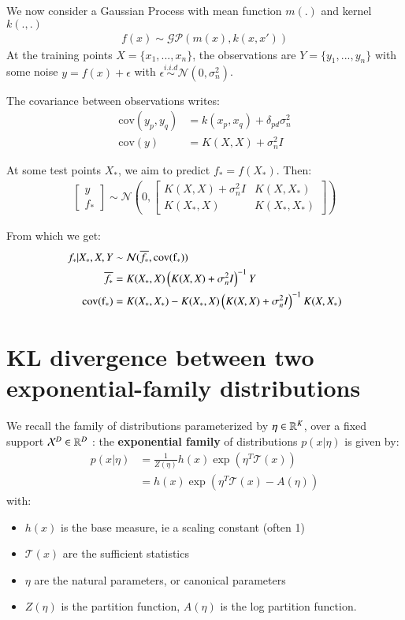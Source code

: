 We now consider a Gaussian Process with mean function $m(.)$ and kernel $k(.,.)$
\begin{align}
    f(x) \sim \mathcal{GP}(m(x), k(x,x'))
\end{align}
At the training points $X = \{x_1,...,x_n\}$, the observations are $Y=\{y_1,...,y_n\}$ with some noise $y = f(x) + \epsilon$ with $\epsilon \overset{i.i.d}{\sim} \mathcal{N}(0,\sigma_n^2)$.

The covariance between observations writes:
\begin{align}
    \text{cov}(y_p,y_q) &= k(x_p, x_q) + \delta_{pd}\sigma_n^2 \\
    \text{cov}(y) &= K(X,X) + \sigma_n^2 I
\end{align}

At some test points $X_*$, we aim to predict $f_* = f(X_*)$. Then:
\begin{align}
    \begin{bmatrix}
        y \\ f_*
    \end{bmatrix} \sim \mathcal{N} \left( 0, \begin{bmatrix}
        K(X,X)+\sigma_n^2I & K(X,X_*) \\ K(X_*,X) & K(X_*,X_*)
    \end{bmatrix}\right)
\end{align}

From which we get:
\begin{align}
    f_* \vert X_*, X, Y &\sim \mathcal{N}(\overline{f_*}, \rm{cov(f_*)}) \\
    \overline{f_*} &= K(X_*,X) \left( K(X,X) + \sigma_n^2 I\right)^{-1}Y \\
    \rm{cov}(f_*) &= K(X_*,X_*) - K(X_*,X) \left( K(X,X) + \sigma_n^2I\right)^{-1} K(X,X_*)
\end{align}


\chapter{KL divergence between two exponential-family distributions}\label{sec:KL-two-exponential-family-distributions}

We recall the family of distributions parameterized by $\eta \in \mathbb{R}^K$, over a fixed support $\mathcal{X}^D \in \mathbb{R}^D$ : the \textbf{exponential family} of distributions $p(x \vert \eta)$ is given by:
\begin{align}
    p(x \vert \eta) &= \frac{1}{Z(\eta)} h(x) \exp\left(\eta^T \mathcal{T}(x)\right) \\
    &= h(x) \exp \left( \eta^T \mathcal{T}(x) - A(\eta)\right)
\end{align}
with:
\begin{itemize}
    \item $h(x)$ is the base measure, ie a scaling constant (often 1)
    \item $\mathcal{T}(x)$ are the sufficient statistics
    \item $\eta$ are the natural parameters, or canonical parameters
    \item $Z(\eta)$ is the partition function, $A(\eta)$ is the log partition function.
\end{itemize}

